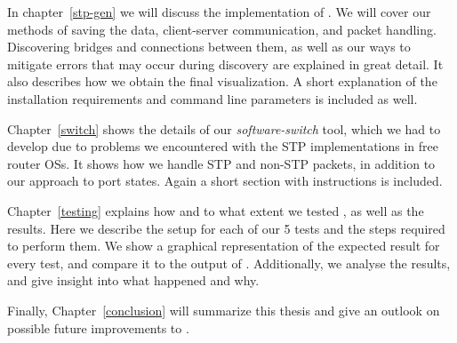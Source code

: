 In chapter~\ref{stp-gen} we will discuss the implementation of \tool.
We will cover our methods of saving the data, client-server communication, and packet handling.
Discovering bridges and connections between them, as well as our ways to mitigate errors that may occur during discovery are explained in great detail.
It also describes how we obtain the final visualization.
A short explanation of the installation requirements and command line parameters is included as well.


Chapter~\ref{switch} shows the details of our \textit{software-switch} tool, which we had to develop due to problems we encountered with the STP implementations in free router OSs\cite{OpenWrt}\cite{dd-wrt}.
It shows how we handle STP and non-STP packets, in addition to our approach to port states.
Again a short section with instructions is included.

Chapter~\ref{testing} explains how and to what extent we tested \tool, as well as the results.
Here we describe the setup for each of our 5 tests and the steps required to perform them.
We show a graphical representation of the expected result for every test, and compare it to the output of \tool.
Additionally, we analyse the results, and give insight into what happened and why.

Finally, Chapter~\ref{conclusion} will summarize this thesis and give an outlook on possible future improvements to \tool.
